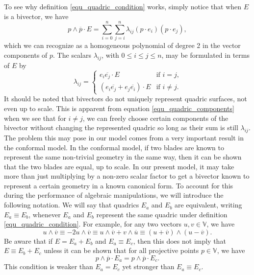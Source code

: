 \documentclass{birkjour}
\theoremstyle{definition}
\theoremstyle{remark}
\numberwithin{equation}{section}
\newcommand{\V}{\mathbb{V}}
\begin{document}
To see why definition \eqref{equ_quadric_condition} works, simply notice that when $E$ is a bivector, we have
\begin{equation}\label{equ_homogeneous_polynomial}
p\wedge\overline{p}\cdot E=\sum_{i=0}^n\sum_{j=i}^n \lambda_{ij}(p\cdot e_i)(p\cdot e_j),
\end{equation}
which we can recognize as a homogeneous polynomial of degree 2 in the vector components of $p$.
The scalars $\lambda_{ij}$, with $0\leq i\leq j\leq n$, may be formulated in terms of $E$ by
\begin{equation}\label{equ_quadric_components}
\lambda_{ij} = \left\{\begin{array}{ll}
e_i\overline{e_j}\cdot E & \mbox{if $i=j$,} \\
\left(e_i\overline{e_j}+e_j\overline{e_i}\right)\cdot E & \mbox{if $i\neq j$.}
\end{array}\right.
\end{equation}
It should be noted that bivectors do not uniquely represent quadric surfaces, not even up to scale.
This is apparent from equation \eqref{equ_quadric_components} when we see that for $i\neq j$,
we can freely choose certain components of the bivector without changing the represented
quadric so long as their sum is still $\lambda_{ij}$.  The problem this may pose in our model
comes from a very important result in the conformal model.  In the conformal model, if
two blades are known to represent the same non-trivial geometry in the same way,
then it can be shown that the two blades are equal, up to scale.
In our present model, it may take more than just
multiplying by a non-zero scalar factor to get a bivector known to represent a certain geometry in a
known canonical form.  To account for this during the performance of algebraic manipulations,
we will introduce the following notation.  We will say that quadrics $E_a$ and $E_b$ are
equivalent, writing $E_a\equiv E_b$, whenever $E_a$ and $E_b$ represent the same quadric
under definition \eqref{equ_quadric_condition}.  For example, for any two vectors $u,v\in\V$, we have
\begin{equation}
u\wedge\overline{v}\equiv -2u\wedge\overline{v}\equiv u\wedge\overline{v}+v\wedge\overline{u}
\equiv(u+\overline{v})\wedge(u-\overline{v}).
\end{equation}
Be aware that if $E=E_a+E_b$ and $E_a\equiv E_c$, then this does not imply that $E\equiv E_b+E_c$
unless it can be shown that for all projective points $p\in\V$, we have
\begin{equation}
p\wedge\overline{p}\cdot E_a=p\wedge\overline{p}\cdot E_c.
\end{equation}
This condition is weaker than $E_a=E_c$ yet stronger than $E_a\equiv E_c$.
\end{document}
